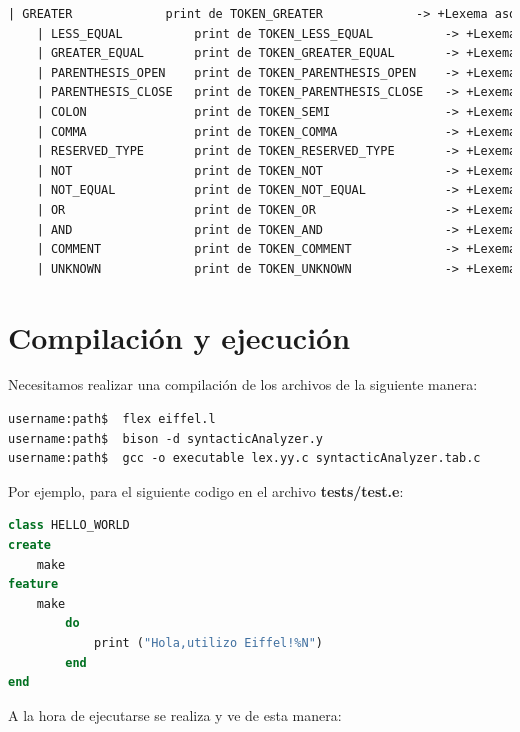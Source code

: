 \documentclass[a4paper,12pt]{article}
\begin{document}
\begin{lstlisting}[language=Eiffel, style=myeiffel]
    | GREATER             print de TOKEN_GREATER             -> +Lexema asociado
    | LESS_EQUAL          print de TOKEN_LESS_EQUAL          -> +Lexema asociado
    | GREATER_EQUAL       print de TOKEN_GREATER_EQUAL       -> +Lexema asociado
    | PARENTHESIS_OPEN    print de TOKEN_PARENTHESIS_OPEN    -> +Lexema asociado
    | PARENTHESIS_CLOSE   print de TOKEN_PARENTHESIS_CLOSE   -> +Lexema asociado
    | COLON               print de TOKEN_SEMI                -> +Lexema asociado
    | COMMA               print de TOKEN_COMMA               -> +Lexema asociado
    | RESERVED_TYPE       print de TOKEN_RESERVED_TYPE       -> +Lexema asociado
    | NOT                 print de TOKEN_NOT                 -> +Lexema asociado
    | NOT_EQUAL           print de TOKEN_NOT_EQUAL           -> +Lexema asociado
    | OR                  print de TOKEN_OR                  -> +Lexema asociado
    | AND                 print de TOKEN_AND                 -> +Lexema asociado
    | COMMENT             print de TOKEN_COMMENT             -> +Lexema asociado
    | UNKNOWN             print de TOKEN_UNKNOWN             -> +Lexema asociado

\end{lstlisting}
\vspace{6mm}
\section{Compilación y ejecución}
\vspace{4mm}

\noindent
Necesitamos realizar una compilación de los archivos de la siguiente manera:

\begin{lstlisting}[style=DOS]
username:path$  flex eiffel.l
username:path$  bison -d syntacticAnalyzer.y
username:path$  gcc -o executable lex.yy.c syntacticAnalyzer.tab.c
\end{lstlisting}

\vspace{4mm}
\noindent
Por ejemplo, para el siguiente codigo en el archivo \textbf{tests/test.e}:

\begin{lstlisting}[language=Eiffel, style=myeiffel]
class HELLO_WORLD
create
    make
feature
    make
        do
            print ("Hola,utilizo Eiffel!%N")
        end
end
\end{lstlisting}

\vspace{4mm}
\noindent
A la hora de ejecutarse se realiza y ve de esta manera:
\end{document}
